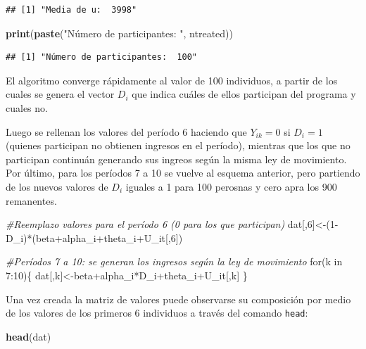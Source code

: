 \documentclass[]{article}
\newenvironment{Shaded}{\begin{snugshade}}{\end{snugshade}}
\newcommand{\KeywordTok}[1]{\textcolor[rgb]{0.13,0.29,0.53}{\textbf{{#1}}}}
\newcommand{\DecValTok}[1]{\textcolor[rgb]{0.00,0.00,0.81}{{#1}}}
\newcommand{\StringTok}[1]{\textcolor[rgb]{0.31,0.60,0.02}{{#1}}}
\newcommand{\CommentTok}[1]{\textcolor[rgb]{0.56,0.35,0.01}{\textit{{#1}}}}
\newcommand{\NormalTok}[1]{{#1}}
\begin{document}
\begin{verbatim}
## [1] "Media de u:  3998"
\end{verbatim}

\begin{Shaded}
\begin{Highlighting}[]
  \KeywordTok{print}\NormalTok{(}\KeywordTok{paste}\NormalTok{(}\StringTok{"Número de participantes: "}\NormalTok{, ntreated))  }
\end{Highlighting}
\end{Shaded}

\begin{verbatim}
## [1] "Número de participantes:  100"
\end{verbatim}

El algoritmo converge rápidamente al valor de 100 individuos, a partir
de los cuales se genera el vector $D_{i}$ que indica cuáles de ellos
participan del programa y cuales no.

Luego se rellenan los valores del período 6 haciendo que $Y_{ik}=0$ si
$D_{i}=1$ (quienes participan no obtienen ingresos en el período),
mientras que los que no participan continuán generando sus ingreos según
la misma ley de movimiento. Por último, para los períodos 7 a 10 se
vuelve al esquema anterior, pero partiendo de los nuevos valores de
$D_{i}$ iguales a 1 para 100 perosnas y cero apra los 900 remanentes.

\begin{Shaded}
\begin{Highlighting}[]
\CommentTok{#Reemplazo valores para el período 6 (0 para los que participan)}
\NormalTok{dat[,}\DecValTok{6}\NormalTok{]<-(}\DecValTok{1}\NormalTok{-D_i)*(beta+alpha_i+theta_i+U_it[,}\DecValTok{6}\NormalTok{])}


\CommentTok{#Períodos 7 a 10: se generan los ingresos según la ley de movimiento}
\NormalTok{for(k in }\DecValTok{7}\NormalTok{:}\DecValTok{10}\NormalTok{)\{}
  \NormalTok{dat[,k]<-beta+alpha_i*D_i+theta_i+U_it[,k]}
\NormalTok{\}}
\end{Highlighting}
\end{Shaded}

Una vez creada la matriz de valores puede observarse su composición por
medio de los valores de los primeros 6 individuos a través del comando
\texttt{head}:

\begin{Shaded}
\begin{Highlighting}[]
\KeywordTok{head}\NormalTok{(dat)}
\end{Highlighting}
\end{Shaded}
\end{document}
